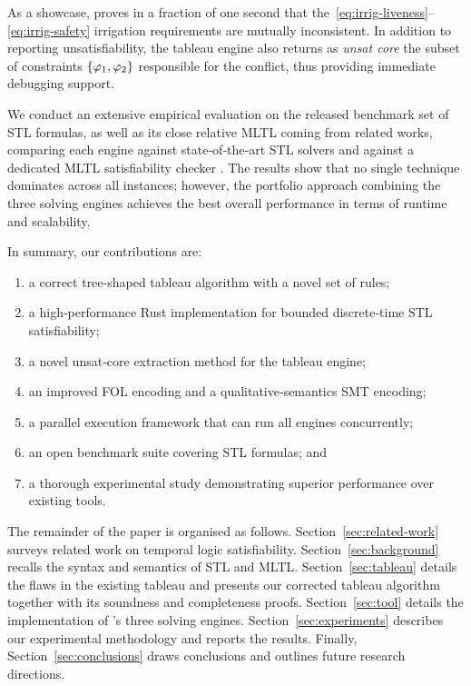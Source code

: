 \documentclass{easychair}
\begin{document}




As a showcase, \stlsat{} proves in a fraction of one second that the~\eqref{eq:irrig-liveness}–\eqref{eq:irrig-safety} irrigation requirements are mutually inconsistent.
In addition to reporting unsatisfiability, the tableau engine also returns as \emph{unsat core} the subset of constraints $\{ \varphi_1, \varphi_2 \}$ responsible for the conflict, thus providing immediate debugging support. 

We conduct an extensive empirical evaluation on the released benchmark set of STL formulas, as well as its close relative MLTL coming from related works, comparing each \stlsat{} engine against state‑of‑the‑art STL solvers and against a dedicated MLTL satisfiability checker \citep{ReinbacherRS14}.
The results show that no single technique dominates across all instances; however, the portfolio approach combining the three \stlsat{} solving engines achieves the best overall performance in terms of runtime and scalability.

\noindent In summary, our contributions are:
\begin{enumerate}[label=\arabic*.,  nosep]
    \item a correct tree-shaped tableau algorithm with a novel set of rules;
    \item a high‑performance Rust implementation for bounded discrete‑time STL
    satisfiability;
    \item a novel unsat‑core extraction method for the tableau engine;
    \item an improved FOL encoding and a qualitative‑semantics SMT encoding;
    \item a parallel execution framework that can run all engines concurrently;
    \item an open benchmark suite covering STL formulas; and
    \item a thorough experimental study demonstrating superior performance over
    existing tools.
\end{enumerate}

The remainder of the paper is organised as follows.
Section~\ref{sec:related-work} surveys related work on temporal logic satisfiability.
Section~\ref{sec:background} recalls the syntax and semantics of STL and MLTL.
Section~\ref{sec:tableau} details the flaws in the existing tableau \cite{MelaniBC25} and presents our corrected tableau algorithm together with its soundness and completeness proofs.
Section~\ref{sec:tool} details the implementation of \stlsat{}'s three solving engines.
Section~\ref{sec:experiments} describes our experimental methodology and reports the results.
Finally, Section~\ref{sec:conclusions} draws conclusions and outlines future research directions.
\end{document}
